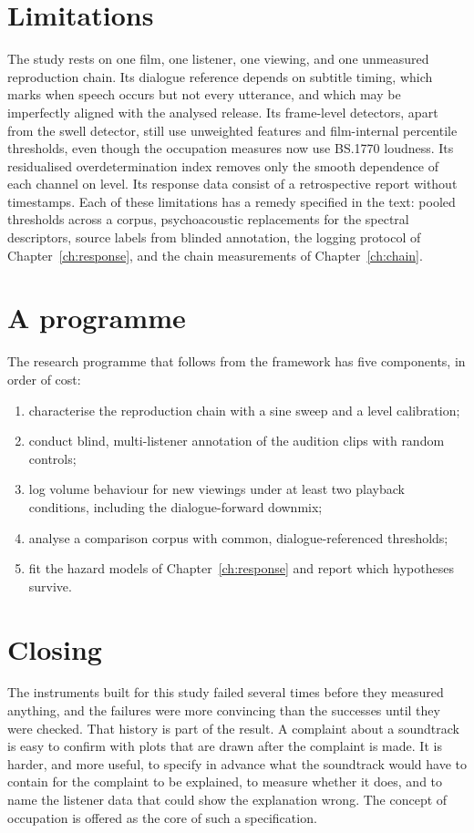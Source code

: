 \section{Limitations}

The study rests on one film, one listener, one viewing, and one unmeasured reproduction chain. Its dialogue reference depends on subtitle timing, which marks when speech occurs but not every utterance, and which may be imperfectly aligned with the analysed release. Its frame-level detectors, apart from the swell detector, still use unweighted features and film-internal percentile thresholds, even though the occupation measures now use BS.1770 loudness. Its residualised overdetermination index removes only the smooth dependence of each channel on level. Its response data consist of a retrospective report without timestamps. Each of these limitations has a remedy specified in the text: pooled thresholds across a corpus, psychoacoustic replacements for the spectral descriptors, source labels from blinded annotation, the logging protocol of Chapter~\ref{ch:response}, and the chain measurements of Chapter~\ref{ch:chain}.

\section{A programme}

The research programme that follows from the framework has five components, in order of cost:
\begin{enumerate}
\item characterise the reproduction chain with a sine sweep and a level calibration;
\item conduct blind, multi-listener annotation of the audition clips with random controls;
\item log volume behaviour for new viewings under at least two playback conditions, including the dialogue-forward downmix;
\item analyse a comparison corpus with common, dialogue-referenced thresholds;
\item fit the hazard models of Chapter~\ref{ch:response} and report which hypotheses survive.
\end{enumerate}

\section{Closing}

The instruments built for this study failed several times before they measured anything, and the failures were more convincing than the successes until they were checked. That history is part of the result. A complaint about a soundtrack is easy to confirm with plots that are drawn after the complaint is made. It is harder, and more useful, to specify in advance what the soundtrack would have to contain for the complaint to be explained, to measure whether it does, and to name the listener data that could show the explanation wrong. The concept of occupation is offered as the core of such a specification.
